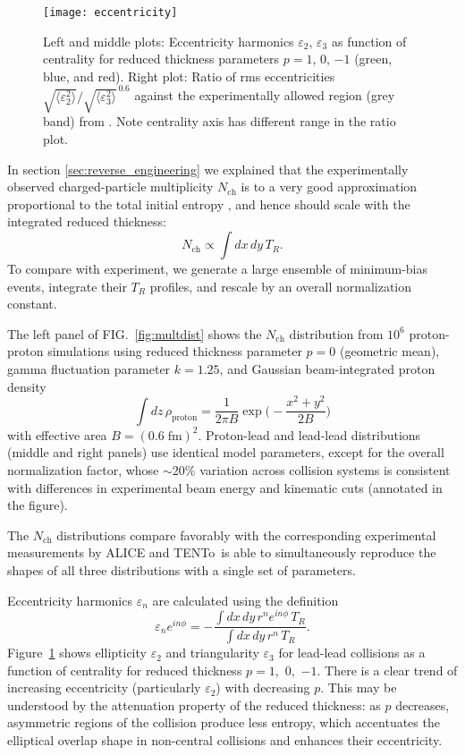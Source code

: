 \documentclass[aps,prc,reprint,amsmath,nofootinbib]{revtex4-1}
\newcommand{\trento}{T\raisebox{-.5ex}{R}ENTo}
\newcommand{\nch}{N_\text{ch}}
\newcommand{\eccratio}{\sqrt{\langle \varepsilon_2^2 \rangle}/\sqrt{\langle \varepsilon_3^2 \rangle}^{\,0.6}}
\begin{document}
\begin{figure}[t]
  \texttt{[image: eccentricity]}
  \caption{
    \label{fig:eccen}
    Left and middle plots:  Eccentricity harmonics $\varepsilon_2$, $\varepsilon_3$ as function of centrality
    for reduced thickness parameters $p = 1$, 0, $-1$ (green, blue, and red).  Right plot:  Ratio of rms eccentricities
    $\eccratio$ against the experimentally allowed region (grey band) from \cite{Retinskaya:2014zea}.  Note centrality
    axis has different range in the ratio plot.
  }
\end{figure}

In section \ref{sec:reverse_engineering} we explained that the experimentally observed charged-particle multiplicity $\nch$ is to a very good approximation proportional to 
the total initial entropy \cite{Song:2008si}, and hence should scale with the integrated reduced thickness:
\begin{equation}
  \nch \propto \int dx \, dy \, T_R.
\end{equation}
To compare with experiment, we generate a large ensemble of minimum-bias events, integrate their $T_R$ profiles, and rescale by an overall normalization constant.

The left panel of FIG.~\ref{fig:multdist} shows the $\nch$ distribution from $10^6$ proton-proton simulations
using reduced thickness parameter $p = 0$ (geometric mean), gamma fluctuation parameter $k = 1.25$, and
Gaussian beam-integrated proton density
\begin{equation}
  \int dz \, \rho_\text{proton} = \frac{1}{2\pi B} \exp\biggr( -\frac{x^2 + y^2}{2B} \biggr)
\end{equation}
with effective area $B = (0.6\;\text{fm})^2$.
Proton-lead and lead-lead distributions (middle and right panels) use identical model parameters, except for the overall normalization factor, whose $\sim$20\% variation across collision systems is consistent with differences in experimental beam energy and kinematic cuts (annotated in the figure).

The $\nch$ distributions compare favorably with the corresponding experimental measurements by ALICE \cite{Aamodt:2010ft,Abelev:2014mda} and \trento\ is able to 
simultaneously reproduce the shapes of all three distributions with a single set of parameters. 

Eccentricity harmonics $\varepsilon_n$ are calculated using the definition
\begin{equation}
  \varepsilon_n e^{i n\phi} = -\frac{\int dx \, dy\, r^n e^{i n \phi} \, T_R}{\int dx \, dy \, r^n \, T_R}.
\end{equation}
Figure~\ref{fig:eccen} shows ellipticity $\varepsilon_2$ and triangularity $\varepsilon_3$ for lead-lead collisions as a function of centrality for reduced thickness $p = 1$,~0,~$-1$.  There is a clear trend of increasing eccentricity
(particularly $\varepsilon_2$) with decreasing $p$.  This may be understood by the attenuation property of the
reduced thickness:  as $p$ decreases, asymmetric regions of the collision produce less entropy, which
accentuates the elliptical overlap shape in non-central collisions and enhances their eccentricity.
\end{document}
